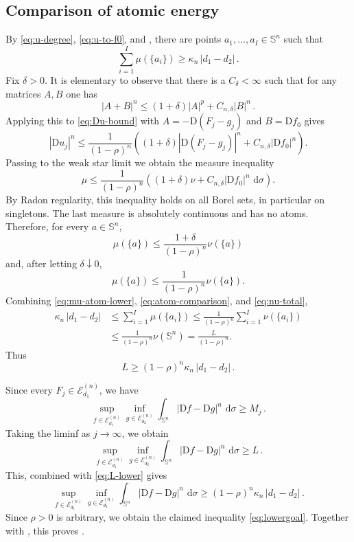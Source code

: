 \documentclass[11pt,reqno]{amsart}
\numberwithin{equation}{section}
\newcommand{\Sph}{\mathbb S}
\newcommand{\E}{\mathcal E}
\newcommand{\D}{\mathrm D}
\newcommand{\dd}{\,\mathrm d}
\begin{document}
\subsection{Comparison of atomic energy}
By \eqref{eq:u-degree}, \eqref{eq:u-to-f0}, and , there are points $a_1,\dots,a_I \in\Sph^n$ such that
\begin{equation}\label{eq:mu-atom-lower}
  \sum_{i=1}^I\mu(\{a_i\})\ge\kappa_n \, |d_1-d_2|\,.
\end{equation}
Fix $\delta>0$. It is elementary to observe that there is a $C_\delta<\infty$ such that for any matrices $A,B$ one has
\begin{equation}\label{eq:power-inequality}
  |A+B|^n \le(1+\delta)|A|^p+C_{n,\delta}|B|^n \,.
\end{equation}
Applying this to \eqref{eq:Du-bound} with $A=-\D (F_j-g_j)$ and $B=\D f_0$ gives
\begin{equation}\label{eq:measure-density-comparison}
  |\D u_j|^n
  \le\frac1{(1-\rho)^n}
  \left((1+\delta)|\D (F_j-g_j)|^n
    +C_{n,\delta}|\D f_0|^n\right).
\end{equation}
Passing to the weak star limit we obtain the measure inequality
\begin{equation}\label{eq:measure-comparison}
  \mu\le\frac1{(1-\rho)^n}
  \left((1+\delta)\nu
    +C_{n,\delta}|\D f_0|^n\,\dd\sigma\right).
\end{equation}
By Radon regularity, this inequality holds on all Borel sets, in particular on singletons.  The last measure is absolutely continuous and has no atoms.  Therefore, for every $a\in\Sph^n$,
\[
  \mu(\{a\})
  \le\frac{1+\delta}{(1-\rho)^n}\nu(\{a\})
\]
and, after letting $\delta\downarrow0$,
\begin{equation}\label{eq:atom-comparison}
  \mu(\{a\})
  \le\frac1{(1-\rho)^n}\nu(\{a\}).
\end{equation}
Combining \eqref{eq:mu-atom-lower}, \eqref{eq:atom-comparison}, and \eqref{eq:nu-total},
\begin{align*}
  \kappa_n \, |d_1-d_2|
  &\le\sum_{i=1}^I\mu(\{a_i\})
  \le\frac1{(1-\rho)^n}\sum_{i=1}^I\nu(\{a_i\})\\
  &\le\frac1{(1-\rho)^n}\nu(\Sph^n)
  =\frac{L}{(1-\rho)^n}.
\end{align*}
Thus
\begin{equation}\label{eq:L-lower}
  L\ge(1-\rho)^n\kappa_n \, |d_1-d_2|\,. 
\end{equation}

Since every $F_j\in\E_{d_1}^{(n)}$, we have
$$
\sup_{f\in\E_{d_1}^{(n)}}
    \inf_{g\in\E_{d_2}^{(n)}}
    \int_{\Sph^n}|\D f-\D g|^n\,\dd\sigma \geq M_j \,.
$$
Taking the liminf as $j\to\infty$, we obtain
$$
\sup_{f\in\E_{d_1}^{(n)}}
    \inf_{g\in\E_{d_2}^{(n)}}
    \int_{\Sph^n}|\D f-\D g|^n\,\dd\sigma \geq L \,.
$$
This, combined with \eqref{eq:L-lower} gives
$$
\sup_{f\in\E_{d_1}^{(n)}}
    \inf_{g\in\E_{d_2}^{(n)}}
    \int_{\Sph^n}|\D f-\D g|^n\,\dd\sigma \geq (1-\rho)^n\kappa_n \, |d_1-d_2|\,. 
$$
Since $\rho>0$ is arbitrary, we obtain the claimed inequality \eqref{eq:lowergoal}.
Together with , this proves .
\end{document}
